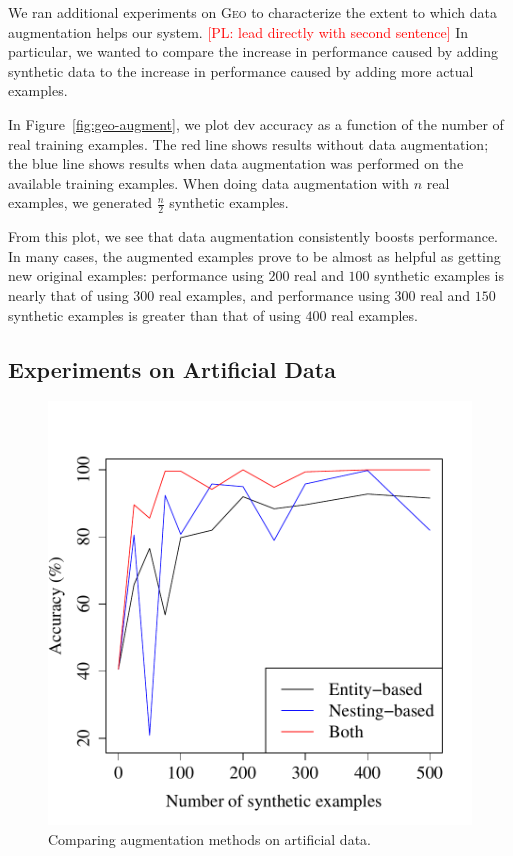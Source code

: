 \documentclass[11pt,letterpaper]{article}
\newcommand{\geo}{\textsc{Geo}\xspace}
\newcommand\pl[1]{\textcolor{red}{[PL: #1]}}
\begin{document}
We ran additional experiments on \geo to characterize
the extent to which data augmentation helps our system.
\pl{lead directly with second sentence}
In particular, we wanted to compare the increase in performance
caused by adding synthetic data to the 
increase in performance caused by adding more actual examples.

In Figure~\ref{fig:geo-augment}, we plot dev accuracy as a function of
the number of real training examples.  
The red line shows results without data augmentation;
the blue line shows results when data augmentation was 
performed on the available training examples.
When doing data augmentation with $n$ real examples,
we generated $\frac{n}2$ synthetic examples.

From this plot, we see that data augmentation consistently boosts performance.
In many cases, the augmented examples prove to be
almost as helpful as getting new original examples:
performance using $200$ real and $100$ synthetic examples
is nearly that of using $300$ real examples,
and performance using $300$ real and $150$ synthetic examples 
is greater than that of using $400$ real examples.

\subsection{Experiments on Artificial Data}
\begin{figure}[t] 
\small
\begin{center} 
  \includegraphics[scale=0.5]{fig-artificial-aug.pdf}
\end{center} 
\caption{Comparing augmentation methods on artificial data.}
\label{fig:artificial}
\end{figure}
\end{document}
